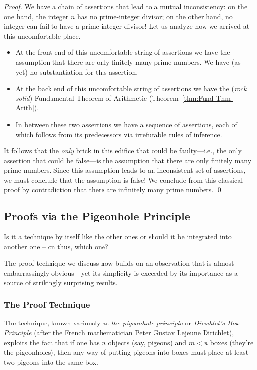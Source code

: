 \begin{proof}
We have a chain of assertions that lead to a mutual inconsistency: on
the one hand, the integer $n$ has no prime-integer divisor; on the
other hand, no integer can fail to have a prime-integer divisor!  Let
us analyze how we arrived at this uncomfortable place.
\begin{itemize}
\item
At the front end of this uncomfortable string of assertions we have
the assumption that there are only finitely many prime numbers.  We
have (as yet) no substantiation for this assertion.
\item
At the back end of this uncomfortable string of assertions we have
the ({\em rock solid}) Fundamental Theorem of Arithmetic
(Theorem~\ref{thm:Fund-Thm-Arith}).
\item
In between these two assertions we have a sequence of assertions, each
of which follows from its predecessors via irrefutable rules of
inference.
\end{itemize}
It follows that the {\em only} brick in this edifice that could be
faulty---i.e., the only assertion that could be false---is the
assumption that there are only finitely many prime numbers.  Since
this assumption leads to an inconsistent set of assertions, we must
conclude that the assumption is false!  We conclude from this
classical proof by contradiction that there are infinitely many prime
numbers.  \qed
\end{proof}


\subsection{Proofs via the Pigeonhole Principle}
\label{sec:pigeonhole}

{\Denis Is it a technique by itself like the other ones or should it be integrated into another one -- on thus, which one?}

The proof technique we discuss now builds on an observation that is
almost embarrassingly obvious---yet its simplicity is exceeded by its
importance as a source of strikingly surprising results.

\subsubsection{The Proof Technique}

The technique, known variously as {\it the pigeonhole principle}
or {\it Dirichlet's Box Principle}
(after the French mathematician Peter Gustav Lejeune Dirichlet),
exploits the fact that if one has $n$ objects (say, pigeons) and $m <
n$ boxes (they're the pigeonholes), then any way of putting pigeons
into boxes must place at least two pigeons into the same box.



